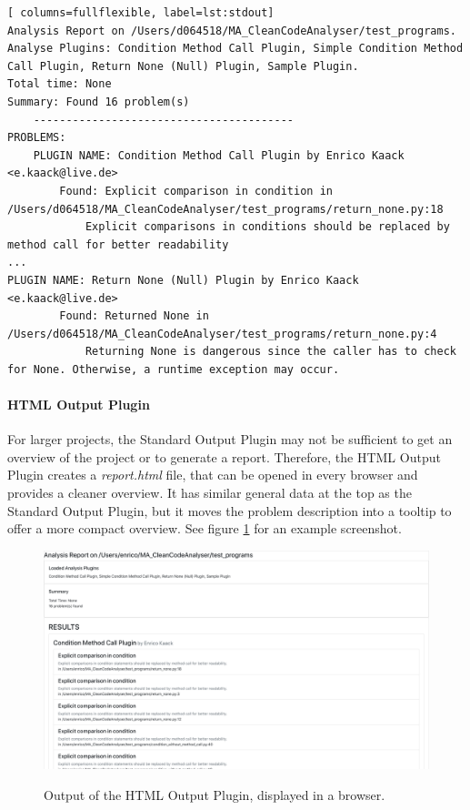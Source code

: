 \begin{minipage}[c]{\linewidth}
\begin{lstlisting}[ columns=fullflexible, label=lst:stdout]
Analysis Report on /Users/d064518/MA_CleanCodeAnalyser/test_programs.
Analyse Plugins: Condition Method Call Plugin, Simple Condition Method Call Plugin, Return None (Null) Plugin, Sample Plugin.
Total time: None
Summary: Found 16 problem(s)
    ----------------------------------------
PROBLEMS:
    PLUGIN NAME: Condition Method Call Plugin by Enrico Kaack <e.kaack@live.de>
        Found: Explicit comparison in condition in /Users/d064518/MA_CleanCodeAnalyser/test_programs/return_none.py:18
            Explicit comparisons in conditions should be replaced by method call for better readability
...
PLUGIN NAME: Return None (Null) Plugin by Enrico Kaack <e.kaack@live.de>
        Found: Returned None in /Users/d064518/MA_CleanCodeAnalyser/test_programs/return_none.py:4
            Returning None is dangerous since the caller has to check for None. Otherwise, a runtime exception may occur.
\end{lstlisting} 
\end{minipage}

\paragraph{HTML Output Plugin}
For larger projects, the Standard Output Plugin may not be sufficient to get an overview of the project or to generate a report. Therefore, the HTML Output Plugin creates a \textit{report.html} file, that can be opened in every browser and provides a cleaner overview. It has similar general data at the top as the Standard Output Plugin, but it moves the problem description into a tooltip to offer a more compact overview. See figure \ref{fig:screen_html_output} for an example screenshot.

\begin{figure}
    \includegraphics[width=1\textwidth]{img/CCAP/screenshot_html_output.png}
    \label{fig:screen_html_output}
    \caption{Output of the HTML Output Plugin, displayed in a browser.}
\end{figure}

